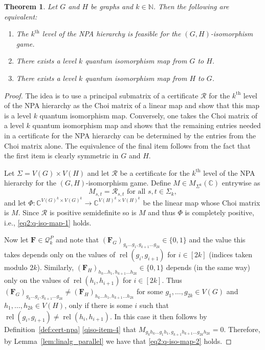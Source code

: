 \documentclass[11pt,a4paper]{article}
\theoremstyle{plain}
\newtheorem{thm}{Theorem}[section]
\theoremstyle{remark}
\theoremstyle{definition}
\DeclareMathOperator{\rel}{rel}
\begin{document}
\begin{thm}\label{thm:main-theorem-1}
    Let $G$ and $H$ be graphs and $k \in \mathbb{N}$. Then the following are equivalent:
    \begin{enumerate}
        \item The $k^\text{th}$ level of the NPA hierarchy is feasible for the $(G,H)$-isomorphism game.
        \item There exists a level $k$ quantum isomorphism map from $G$ to $H$.
        \item There exists a level $k$ quantum isomorphism map from $H$ to $G$.
    \end{enumerate}
\end{thm}
\begin{proof}
    The idea is to use a principal submatrix of a certificate $\mathcal{R}$ for the $k^\text{th}$ level of the NPA hierarchy as the Choi matrix of a linear map and show that this map is a level $k$ quantum isomorphism map. Conversely, one takes the Choi matrix of a level $k$ quantum isomorphism map and shows that the remaining entries needed in a certificate for the NPA hierarchy can be determined by the entries from the Choi matrix alone. The equivalence of the final item follows from the fact that the first item is clearly symmetric in $G$ and $H$.

    Let $\Sigma = V(G) \times V(H)$ and let $\mathcal{R}$ be a certificate for the $k^\text{th}$ level of the NPA hierarchy for the $(G,H)$-isomorphism game. Define $M \in M_{\Sigma^k}(\mathbb{C})$ entrywise as
    \[M_{s,t} = \mathcal{R}_{s,t} \text{ for all } s,t \in \Sigma_k,\]
    and let $\Phi : \mathbb{C}^{V(G)^k \times V(G)^k} \to \mathbb{C}^{V(H)^k \times V(H)^k}$ be the linear map whose Choi matrix is $M$. Since $\mathcal{R}$ is positive semidefinite so is $M$ and thus $\Phi$ is completely positive, i.e., \eqref{eq2:q-iso-map-1} holds.
    
    Now let $\boldsymbol{F} \in \mathcal{Q}_k^P$ and note that $(\boldsymbol{F}_G)_{g_k\ldots g_1, g_{k+1}\ldots g_{2k}} \in \{0,1\}$ and the value this takes depends only on the values of $\rel(g_i,g_{i+1})$ for $i \in [2k]$ (indices taken modulo $2k$). Similarly, $(\boldsymbol{F}_H)_{h_k\ldots h_1, h_{k+1}\ldots h_{2k}} \in \{0,1\}$ depends (in the same way) only on the values of $\rel(h_i,h_{i+1})$ for $i \in [2k]$. Thus $(\boldsymbol{F}_G)_{g_k\ldots g_1, g_{k+1}\ldots g_{2k}} \ne (\boldsymbol{F}_H)_{h_k\ldots h_1, h_{k+1}\ldots h_{2k}}$ for some $g_1, \ldots, g_{2k} \in V(G)$ and $h_1, \ldots, h_{2k} \in V(H)$, only if there is some $i$ such that $\rel(g_i,g_{i+1}) \ne \rel(h_i,h_{i+1})$. In this case it then follows by Definition~\cref{def:cert-npa} \ref{qiso-item-4} that $M_{g_kh_k\ldots g_1h_1,g_{k+1}h_{k+1}\ldots g_{2k}h_{2k}} = 0$. Therefore, by Lemma~\ref{lem:linalg_parallel} we have that \eqref{eq2:q-iso-map-2} holds.


\end{proof}
\end{document}
